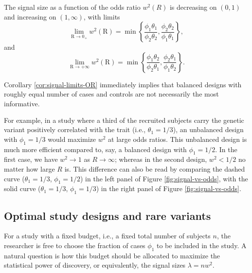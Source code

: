 \begin{corollary} \label{cor:signal-limits-OR}
The signal size as a function of the odds ratio $w^2(R)$ is decreasing on $(0,1)$ and increasing on $(1,\infty)$, with limits
\begin{equation} \label{eq:signal-size-upper-bound-1}
    \lim_{\text{R}\to0_+} w^2(\text{R}) = \min\left\{\frac{\phi_1\theta_1}{\phi_2\theta_2}, \frac{\phi_2\theta_2}{\phi_1\theta_1}\right\},
\end{equation}
and
\begin{equation} \label{eq:signal-size-upper-bound-2}
    \lim_{\text{R}\to+\infty} w^2(\text{R}) = \min\left\{\frac{\phi_1\theta_2}{\phi_2\theta_1}, \frac{\phi_2\theta_1}{\phi_1\theta_2}\right\}.
\end{equation}
\end{corollary}

Corollary \ref{cor:signal-limits-OR} immediately implies that balanced designs with roughly equal number of cases and controls are not necessarily the most informative.

For example, in a study where a third of the recruited subjects carry the genetic variant positively correlated with the trait (i.e., $\theta_1=1/3$), an unbalanced design with $\phi_1=1/3$ would maximize $w^2$ at large odds ratios.
This unbalanced design is much more efficient compared to, say, a balanced design with $\phi_1=1/2$.
In the first case, we have $w^2\to1$ as $R\to\infty$; whereas in the second design, $w^2<1/2$ no matter how large $R$ is.
This difference can also be read by comparing the dashed curve ($\theta_1=1/3$, $\phi_1=1/2$) in the left panel of Figure \ref{fig:signal-vs-odds}, with the solid curve ($\theta_1=1/3$, $\phi_1=1/3$) in the right panel of Figure \ref{fig:signal-vs-odds}.

\subsection{Optimal study designs and rare variants}
\label{subsec:optimal-design} 

For a study with a fixed budget, i.e., a fixed total number of subjects $n$, the researcher is free to choose the fraction of cases $\phi_1$ to be included in the study.
A natural question is how this budget should be allocated to maximize the statistical power of discovery, or equivalently, the signal sizes $\lambda=nw^2$.

